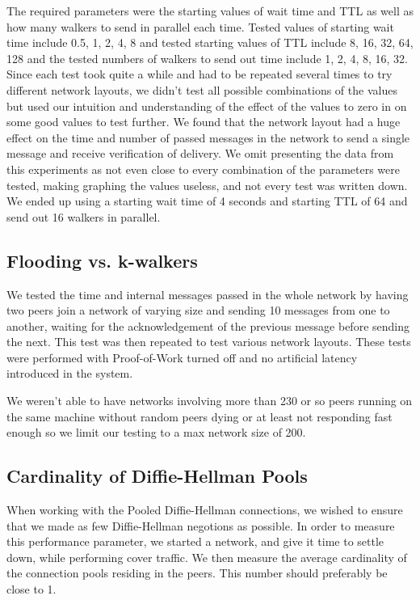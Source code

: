 The required parameters were the starting values of wait time and TTL as well as how many walkers to send in parallel each time. Tested values of starting wait time include 0.5, 1, 2, 4, 8 and tested starting values of TTL include 8, 16, 32, 64, 128 and the tested numbers of walkers to send out time include 1, 2, 4, 8, 16, 32. Since each test took quite a while and had to be repeated several times to try different network layouts, we didn't test all possible combinations of the values but used our intuition and understanding of the effect of the values to zero in on some good values to test further. We found that the network layout had a huge effect on the time and number of passed messages in the network to send a single message and receive verification of delivery. We omit presenting the data from this experiments as not even close to every combination of the parameters were tested, making graphing the values useless, and not every test was written down. We ended up using a starting wait time of 4 seconds and starting TTL of 64 and send out 16 walkers in parallel.

\subsection{Flooding vs. k-walkers}
We tested the time and internal messages passed in the whole network by having two peers join a network of varying size and sending 10 messages from one to another, waiting for the acknowledgement of the previous message before sending the next. This test was then repeated to test various network layouts. These tests were performed with Proof-of-Work turned off and no artificial latency introduced in the system.

We weren't able to have networks involving more than 230 or so peers running on the same machine without random peers dying or at least not responding fast enough so we limit our testing to a max network size of 200.

\subsection{Cardinality of Diffie-Hellman Pools}

When working with the Pooled Diffie-Hellman connections, we wished to ensure that we made as few Diffie-Hellman negotions as possible. In order to measure this performance parameter, we started a network, and give it time to settle down, while performing cover traffic. We then measure the average cardinality of the connection pools residing in the peers. This number should preferably be close to 1.

